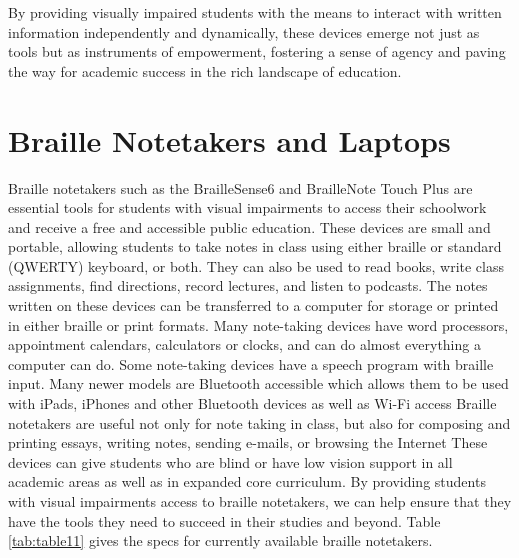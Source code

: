By providing visually impaired students with the means to interact with written information independently and dynamically, these devices emerge not just as tools but as instruments of empowerment, fostering a sense of agency and paving the way for academic success in the rich landscape of education.

\pagebreak
\hypertarget{braille-notetakers-and-braille-laptop-computers}{}\section{Braille Notetakers and Laptops}\label{braille-notetakers-and-braille-laptop-computers}

Braille notetakers such as the BrailleSense6 and BrailleNote Touch Plus are essential tools for students with visual impairments to access their schoolwork and receive a free and accessible public education. These devices are small and portable, allowing students to take notes in class using either braille or standard (QWERTY) keyboard, or both. They can also be used to read books, write class assignments, find directions, record lectures, and listen to podcasts. The notes written on these devices can be transferred to a computer for storage or printed in either braille or print formats. Many note-taking devices have word processors, appointment calendars, calculators or clocks, and can do almost everything a computer can do. Some note-taking devices have a speech program with braille input. Many newer models are Bluetooth accessible which allows them to be used with iPads, iPhones and other Bluetooth devices as well as Wi-Fi access Braille notetakers are useful not only for note taking in class, but also for composing and printing essays, writing notes, sending e-mails, or browsing the Internet These devices can give students who are blind or have low vision support in all academic areas as well as in expanded core curriculum. By providing students with visual impairments access to braille notetakers, we can help ensure that they have the tools they need to succeed in their studies and beyond. Table \ref{tab:table11} gives the specs for currently available braille notetakers.

\pagebreak 
 
